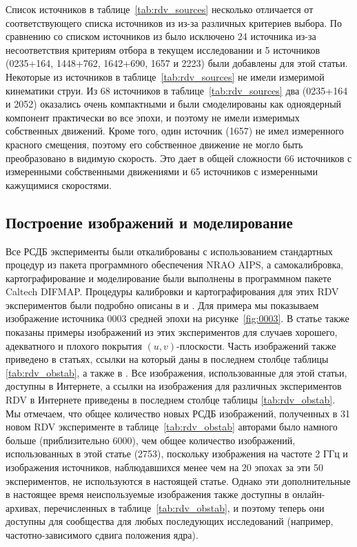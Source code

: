 Список источников в таблице~\ref{tab:rdv_sources} несколько отличается от соответствующего списка
источников из \cite{Piner_2007} из-за различных критериев выбора. По сравнению со списком источников
из \cite{Piner_2007} было исключено 24 источника из-за несоответствия критериям отбора в текущем
исследовании и 5 источников (0235+164, 1448+762, 1642+690, 1657 и 2223)
были добавлены для этой статьи. Некоторые из источников в таблице~\ref{tab:rdv_sources} не имели
измеримой кинематики струи. Из 68 источников в таблице~\ref{tab:rdv_sources} два (0235+164 и
2052) оказались очень компактными и были смоделированы как одноядерный компонент
практически во все эпохи, и поэтому не имели измеримых собственных движений. Кроме того, один
источник (1657) не имел измеренного красного смещения, поэтому его собственное движение
не могло быть преобразовано в видимую скорость. Это дает в общей сложности 66 источников с
измеренными собственными движениями и 65 источников с измеренными кажущимися скоростями.

\subsection{Построение изображений и моделирование}

Все РСДБ эксперименты были откалиброваны с использованием стандартных процедур из пакета
программного обеспечения NRAO AIPS, а самокалибровка, картографирование и моделирование были
выполнены в программном пакете Caltech DIFMAP. Процедуры калибровки и картографирования для этих RDV
экспериментов были подробно описаны в \cite{Piner_2007} и \cite{Pushkarev_Kovalev_2012}. Для примера
мы
показываем изображение источника 0003 средней эпохи на рисунке~\ref{fig:0003}. В статье
\cite{Piner_2007} также показаны примеры изображений из этих экспериментов для случаев хорошего,
адекватного и плохого покрытия $(u, v)$-плоскости. Часть изображений также приведено в статьях,
ссылки на который даны в последнем столбце таблицы \ref{tab:rdv_obstab}, а также в
\cite{Pushkarev_Kovalev_2012}. Все изображения, использованные для этой статьи, доступны в
Интернете, а
ссылки на изображения для различных экспериментов RDV в Интернете приведены в последнем столбце
таблицы \ref{tab:rdv_obstab}. Мы отмечаем, что общее количество новых РСДБ изображений, полученных в
31 новом RDV эксперименте в таблице~\ref{tab:rdv_obstab} авторами было намного больше
(приблизительно 6000), чем общее количество изображений, использованных в этой статье (2753),
поскольку изображения на частоте 2 ГГц и изображения источников, наблюдавшихся менее чем на 20
эпохах за эти 50 экспериментов, не используются в настоящей статье. Однако эти дополнительные в
настоящее время неиспользуемые изображения также доступны в онлайн-архивах, перечисленных в
таблице~\ref{tab:rdv_obstab}, и поэтому теперь они доступны для сообщества для любых последующих
исследований (например, частотно-зависимого сдвига положения ядра).

